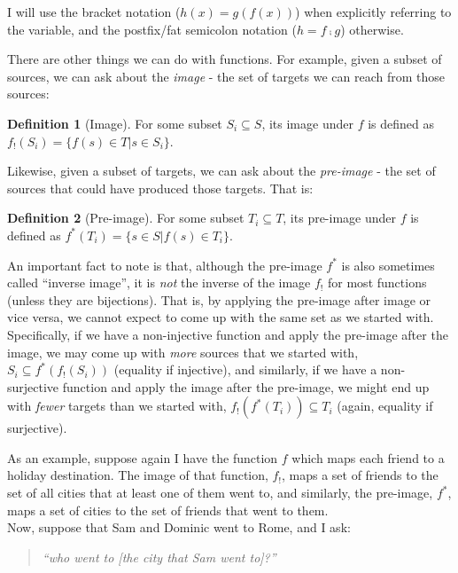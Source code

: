 \documentclass[
]{book}
\theoremstyle{definition}
\newtheorem{definition}{Definition}[chapter]
\theoremstyle{definition}
\theoremstyle{definition}
\theoremstyle{definition}
\theoremstyle{remark}
\begin{document}
I will use the bracket notation (\(h(x) = g(f(x))\)) when explicitly referring to the variable, and the postfix/fat semicolon notation (\(h = f ⨾ g\)) otherwise.

There are other things we can do with functions. For example, given a subset of sources, we can ask about the \emph{image} - the set of targets we can reach from those sources:

\begin{definition}[Image]
For some subset \(S_i \subseteq S\), its image under \(f\) is defined as \(f_!(S_i) = \{ f(s) \in T \lvert s \in S_i \}\).
\end{definition}

Likewise, given a subset of targets, we can ask about the \emph{pre-image} - the set of sources that could have produced those targets. That is:

\begin{definition}[Pre-image]
For some subset \(T_i \subseteq T\), its pre-image under \(f\) is defined as \(f^*(T_i) = \{ s \in S \lvert f(s) \in T_i \}\).
\end{definition}

An important fact to note is that, although the pre-image \(f^*\) is also sometimes called ``inverse image'', it is \emph{not} the inverse of the image \(f_!\) for most functions (unless they are bijections). That is, by applying the pre-image after image or vice versa, we cannot expect to come up with the same set as we started with. Specifically, if we have a non-injective function and apply the pre-image after the image, we may come up with \emph{more} sources that we started with, \(S_i \subseteq f^*(f_!(S_i))\) (equality if injective), and similarly, if we have a non-surjective function and apply the image after the pre-image, we might end up with \emph{fewer} targets than we started with, \(f_!(f^*(T_i)) \subseteq T_i\) (again, equality if surjective).

As an example, suppose again I have the function \(f\) which maps each friend to a holiday destination. The image of that function, \(f_!\), maps a set of friends to the set of all cities that at least one of them went to, and similarly, the pre-image, \(f^*\), maps a set of cities to the set of friends that went to them.\\
Now, suppose that Sam and Dominic went to Rome, and I ask:

\begin{quote}
\emph{``who went to {[}the city that Sam went to{]}?''}
\end{quote}
\end{document}

